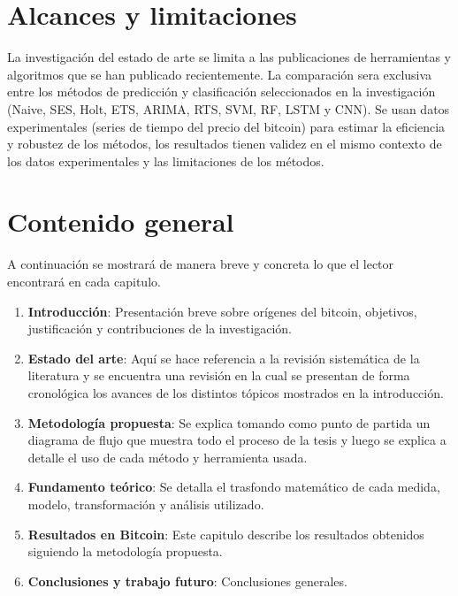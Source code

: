 \section{Alcances y limitaciones}
La investigación del estado de arte se limita a las publicaciones de herramientas y algoritmos que se han publicado recientemente. La comparación sera exclusiva entre los métodos de predicción y clasificación seleccionados en la investigación (Naive, SES, Holt, ETS, ARIMA, RTS, SVM, RF, LSTM y CNN). Se usan datos experimentales (series de tiempo del precio del bitcoin) para estimar la eficiencia y robustez de los métodos, los resultados tienen validez en el mismo contexto de los datos experimentales y las limitaciones de los métodos.
\vspace{-0.5cm}
\section{Contenido general}
A continuación se mostrará de manera breve y concreta lo que el lector encontrará en cada capitulo.

\begin{enumerate}
	\item \textbf{Introducción}: Presentación breve sobre orígenes del bitcoin, objetivos, justificación y contribuciones de la investigación.
	
	\item \textbf{Estado del arte}: Aquí se hace referencia a la revisión sistemática de la literatura y se encuentra una revisión en la cual se presentan de forma cronológica los avances de los distintos tópicos mostrados en la introducción. 
	
	\item \textbf{Metodología propuesta}: Se explica tomando como punto de partida un diagrama de flujo que muestra todo el proceso de la tesis y luego se explica a detalle el uso de cada método y herramienta usada.
	
	\item \textbf{Fundamento teórico}: Se detalla el trasfondo matemático de cada medida, modelo, transformación y análisis utilizado.
	
	\item \textbf{Resultados en Bitcoin}: Este capitulo describe los resultados obtenidos siguiendo la metodología propuesta.
	
	\item \textbf{Conclusiones y trabajo futuro}: Conclusiones generales.
\end{enumerate}


